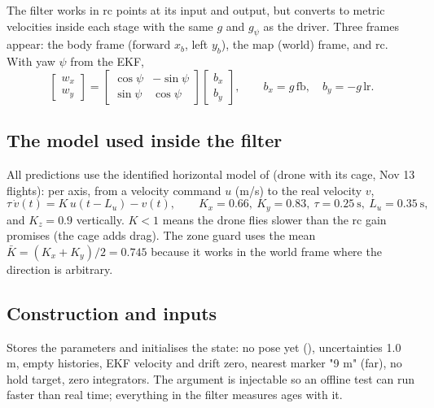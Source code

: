 The filter works in rc points at its input and output, but converts to metric velocities inside each stage with
the same  $g$ and  $g_\psi$ as the driver. Three frames appear: the body frame
(forward $x_b$, left $y_b$), the map (world) frame, and rc. With yaw $\psi$ from the EKF,
$$
\begin{bmatrix} w_x \\ w_y \end{bmatrix} =
\begin{bmatrix} \cos\psi & -\sin\psi \\ \sin\psi & \cos\psi \end{bmatrix}
\begin{bmatrix} b_x \\ b_y \end{bmatrix},
\qquad b_x = g\,\text{fb},\quad b_y = -g\,\text{lr}.
$$

\subsection{The model used inside the filter}

All predictions use the identified horizontal model of  (drone with its cage, Nov 13 flights): per
axis, from a velocity command $u$ (m/s) to the real velocity $v$,
$$
\tau\,\dot v(t) = K\,u(t-L_u) - v(t), \qquad K_x = 0.66,\ K_y = 0.83,\ \tau = 0.25\ \text{s},\ L_u = 0.35\ \text{s},
$$
and $K_z = 0.9$ vertically. $K<1$ means the drone flies slower than the rc gain promises (the cage adds drag).
The zone guard uses the mean $\bar K = (K_x+K_y)/2 = 0.745$ because it works in the world frame where the direction
is arbitrary.

\subsection{Construction and inputs}

Stores the parameters and initialises the state: no pose yet (), uncertainties 1.0 m, empty
histories, EKF velocity and drift zero, nearest marker "9 m" (far), no hold target, zero integrators. The
 argument is injectable so an offline test can run faster than real time; everything in the filter
measures ages with it.

